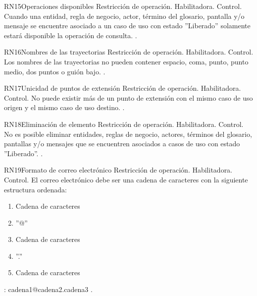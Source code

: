 \begin{BussinesRule}{RN15}{Operaciones disponibles} 
	\BRitem[Tipo:] Restricción de operación. 
	\BRitem[Clase:] Habilitadora. 
	\BRitem[Nivel:] Control. %
	\BRitem[Descripción:] Cuando una entidad, regla de negocio, actor, término del glosario, pantalla y/o mensaje se encuentre asociado a un caso de uso con estado ''Liberado'' solamente estará disponible la operación de consulta.
	 \UCref{}{}. 
\end{BussinesRule}

\begin{BussinesRule}{RN16}{Nombres de las trayectorias} 
	\BRitem[Tipo:] Restricción de operación. 
	\BRitem[Clase:] Habilitadora. 
	\BRitem[Nivel:] Control. %
	\BRitem[Descripción:] Los nombres de las trayectorias no pueden contener espacio, coma, punto, punto medio, dos puntos o guión bajo.
	 \UCref{}{}. 
\end{BussinesRule}


\begin{BussinesRule}{RN17}{Unicidad de puntos de extensión} 
	\BRitem[Tipo:] Restricción de operación. 
	\BRitem[Clase:] Habilitadora. 
	\BRitem[Nivel:] Control. %
	\BRitem[Descripción:] No puede existir más de un punto de extensión con el mismo caso de uso origen y el mismo caso de uso destino.
	 \UCref{}{}. 
\end{BussinesRule}


\begin{BussinesRule}{RN18}{Eliminación de elemento} 
	\BRitem[Tipo:] Restricción de operación. 
	\BRitem[Clase:] Habilitadora. 
	\BRitem[Nivel:] Control. %
	\BRitem[Descripción:] No es posible eliminar entidades, reglas de negocio, actores, términos del glosario, pantallas y/o mensajes que se encuentren asociados a casos de uso con estado ''Liberado''.
	 \UCref{}{}. 
\end{BussinesRule}

\begin{BussinesRule}{RN19}{Formato de correo electrónico} 
	\BRitem[Tipo:] Restricción de operación. 
	\BRitem[Clase:] Habilitadora. 
	\BRitem[Nivel:] Control. %
	\BRitem[Descripción:] El correo electrónico debe ser una cadena de caracteres con la siguiente estructura ordenada:
	\begin{enumerate}
		\item Cadena de caracteres
		\item ''@''
		\item Cadena de caracteres
		\item ''.''
		\item Cadena de caracteres
	\end{enumerate}
	\BRitem[Ejemplo]: cadena1@cadena2.cadena3
	 \UCref{}{}. 
\end{BussinesRule}

